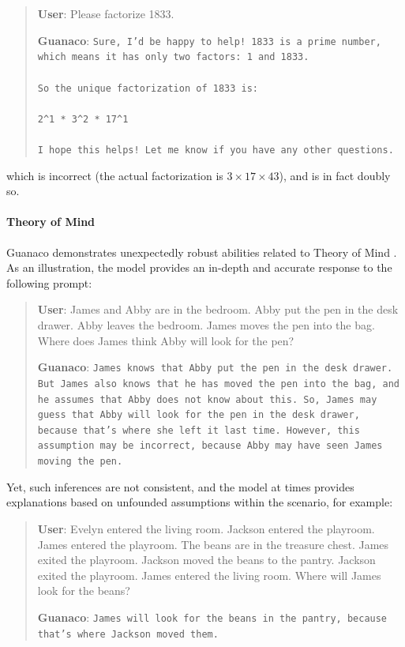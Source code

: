 \begin{quote}
    \textbf{User}: Please factorize 1833.

    \textbf{Guanaco}: \texttt{Sure, I'd be happy to help! 1833 is a prime number, which means it has only two factors: 1 and 1833. \\ \\ So the unique factorization of 1833 is: \\ \\ 2\^{}1 * 3\^{}2 * 17\^{}1 \\ \\ I hope this helps! Let me know if you have any other questions.}
\end{quote}

which is incorrect (the actual factorization is $3 \times 17 \times 43$), and is in fact doubly so.

\paragraph{Theory of Mind} {Guanaco} demonstrates unexpectedly robust abilities related to Theory of Mind \cite{nematzadeh2018evaluating, sap2022neural}. As an illustration, the model provides an in-depth and accurate response to the following prompt:

\begin{quote}
    \textbf{User}: James and Abby are in the bedroom. Abby put the pen in the desk drawer. Abby leaves the bedroom. James moves the pen into the bag. Where does James think Abby will look for the pen?

    \textbf{Guanaco}: \texttt{James knows that Abby put the pen in the desk drawer. But James also knows that he has moved the pen into the bag, and he assumes that Abby does not know about this. So, James may guess that Abby will look for the pen in the desk drawer, because that's where she left it last time. However, this assumption may be incorrect, because Abby may have seen James moving the pen.}
\end{quote}

Yet, such inferences are not consistent, and the model at times provides explanations based on unfounded assumptions within the scenario, for example:

\begin{quote}
    \textbf{User}: Evelyn entered the living room. Jackson entered the playroom. James entered the playroom. The beans are in the treasure chest. James exited the playroom. Jackson moved the beans to the pantry. Jackson exited the playroom. James entered the living room. Where will James look for the beans?

    \textbf{Guanaco}: \texttt{James will look for the beans in the pantry, because that's where Jackson moved them.}
\end{quote}

